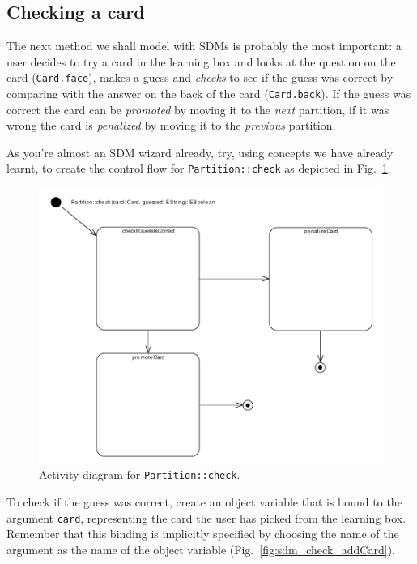 \subsection{Checking a card}

The next method we shall model with SDMs is probably the most important: a user decides to try a card in the learning box and looks at the question on the card (\texttt{Card.face}), makes a guess and \emph{checks} to see if the guess was correct by comparing with the answer on the back of the card (\texttt{Card.back}).  
If the guess was correct the card can be \emph{promoted} by moving it to the \emph{next} partition, if it was wrong the card is \emph{penalized} by moving it to the \emph{previous} partition.

As you're almost an SDM wizard already, try, using concepts we have already learnt, to create the control flow for \texttt{Partition::check} as depicted in Fig.~\ref{fig:sdm_check_start}.

\begin{figure}[htbp]
\begin{center}
  \includegraphics[width=\textwidth]{pics/sdmBilder/check/sdm16RAW.pdf}
  \caption{Activity diagram for \texttt{Partition::check}.}  
  \label{fig:sdm_check_start}
\end{center}
\end{figure}
 
To check if the guess was correct, create an object variable that is bound to
the argument \texttt{card}, representing the card the user has picked from the
learning box.  Remember that this binding is implicitly specified by choosing the
name of the argument as the name of the object variable
(Fig.~\ref{fig:sdm_check_addCard}).

